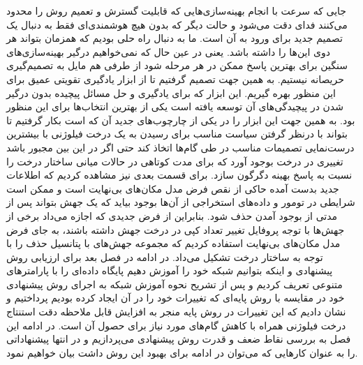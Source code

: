 جایی که سرعت با انجام بهینه‌سازی‌هایی که قابلیت گسترش و تعمیم روش را محدود می‌کنند فدای دقت می‌شود و حالت دیگر که بدون هیچ هوشمند‌ی‌ای فقط به دنبال یک تصمیم جدید برای ورود به آن است. ما به دنبال راه حلی بودیم که همزمان بتواند هر دوی این‌ها را داشته باشد. یعنی در عین حال که نمی‌خواهیم درگیر بهینه‌سازی‌های سنگین برای بهترین پاسخ ممکن در هر مرحله شود از طرفی هم مایل به تصمیم‌گیری حریصانه نیستیم. به همین جهت تصمیم گرفتیم تا از ابزار یادگیری تقویتی عمیق برای این منظور بهره گیریم. این ابزار که برای یادگیری و حل مسائل پیچیده بدون درگیر شدن در پیچیدگی‌های آن توسعه یافته است یکی از بهترین انتخاب‌ها برای این منظور بود. به همین جهت این ابزار را در یکی از چارچوب‌های جدید آن که است بکار گرفتیم تا بتواند با درنظر گرفتن سیاست مناسب برای رسیدن به یک درخت فیلوژنی با بیشترین درست‌نمایی تصمیمات مناسب در طی گام‌ها اتخاذ کند حتی اگر در این بین مجبور باشد تغییری در درخت بوجود آورد که برای مدت کوتاهی در حالات میانی ساختار درخت را نسبت به پاسخ بهینه دگرگون سازد. برای قسمت بعدی نیز مشاهده کردیم که اطلاعات جدید بدست آمده حاکی از نقص فرض مدل مکان‌های بی‌نهایت است و ممکن است شرایطی در تومور و داده‌های استخراجی از آن‌ها بوجود بیاید که یک جهش بتواند پس از مدتی از بوجود آمدن حذف شود. بنابراین از فرض جدیدی که اجازه می‌داد برخی از جهش‌ها با توجه پروفایل تغییر تعداد کپی در درخت جهش داشته باشند، به جای فرض مدل مکان‌های بی‌نهایت استفاده کردیم که مجموعه جهش‌های با پتانسیل حذف را با توجه به ساختار درخت تشکیل می‌داد. در ادامه در فصل بعد برای ارزیابی روش پیشنهادی و اینکه بتوانیم شبکه خود را آموزش دهیم پایگاه داده‌ای را با پارامترهای متنوعی تعریف کردیم و پس از تشریح نحوه آموزش شبکه به اجرای روش پیشنهادی خود در مقایسه با روش پایه‌ای که تغییرات خود را در آن ایجاد کرده بودیم پرداختیم و نشان دادیم که این تغییرات در روش پایه منجر به افزایش قابل ملاحظه دقت استنتاج درخت فیلوژنی همراه با کاهش گام‌های مورد نیاز برای حصول آن است.
  در ادامه این فصل به بررسی نقاط ضعف و قدرت روش پیشنهادی می‌پردازیم و در انتها پیشنهاداتی را به عنوان کارهایی که می‌توان در ادامه برای بهبود این روش داشت بیان خواهیم نمود.
  
